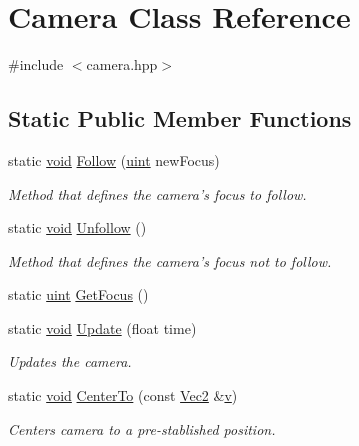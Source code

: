 \hypertarget{class_camera}{\section{Camera Class Reference}
\label{class_camera}
}


{\ttfamily \#include $<$camera.\-hpp$>$}

\subsection*{Static Public Member Functions}
\begin{DoxyCompactItemize}
\item 
static \hyperlink{_s_d_l__opengles2__gl2ext_8h_ae5d8fa23ad07c48bb609509eae494c95}{void} \hyperlink{class_camera_a7727d0873fbed2e6a9c11b8b83e7124b}{Follow} (\hyperlink{common_8hpp_a69aa29b598b851b0640aa225a9e5d61d}{uint} new\-Focus)
\begin{DoxyCompactList}\small\item\em Method that defines the camera's focus to follow. \end{DoxyCompactList}\item 
static \hyperlink{_s_d_l__opengles2__gl2ext_8h_ae5d8fa23ad07c48bb609509eae494c95}{void} \hyperlink{class_camera_ab04eb4c102fac35e149abb9a4320d578}{Unfollow} ()
\begin{DoxyCompactList}\small\item\em Method that defines the camera's focus not to follow. \end{DoxyCompactList}\item 
static \hyperlink{common_8hpp_a69aa29b598b851b0640aa225a9e5d61d}{uint} \hyperlink{class_camera_a6cb4438420649750d4f361817cdf926f}{Get\-Focus} ()
\item 
static \hyperlink{_s_d_l__opengles2__gl2ext_8h_ae5d8fa23ad07c48bb609509eae494c95}{void} \hyperlink{class_camera_acac73848caa61e2aeb54a831f016d69c}{Update} (float time)
\begin{DoxyCompactList}\small\item\em Updates the camera. \end{DoxyCompactList}\item 
static \hyperlink{_s_d_l__opengles2__gl2ext_8h_ae5d8fa23ad07c48bb609509eae494c95}{void} \hyperlink{class_camera_a708e94ea80e72027bf1017a48bac9f71}{Center\-To} (const \hyperlink{class_vec2}{Vec2} \&\hyperlink{_s_d_l__opengl_8h_a10a82eabcb59d2fcd74acee063775f90}{v})
\begin{DoxyCompactList}\small\item\em Centers camera to a pre-\/stablished position. \end{DoxyCompactList}\item 

\end{DoxyCompactItemize}
